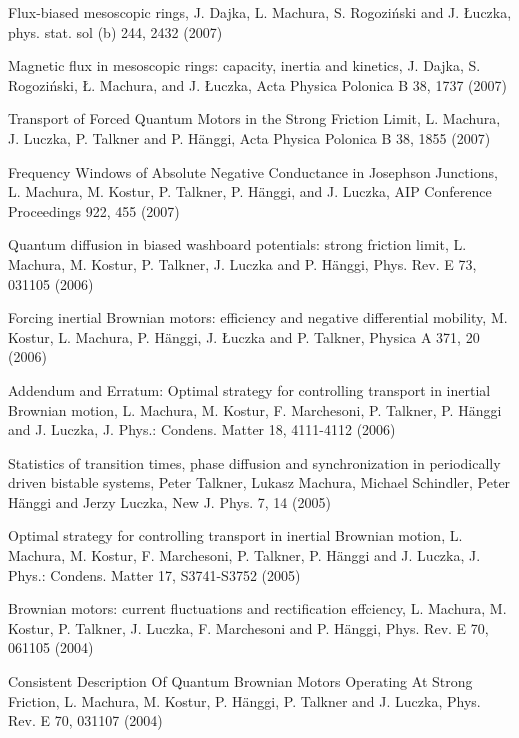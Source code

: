 \begin{etaremune}
\item Flux-biased mesoscopic rings, J. Dajka, L. Machura, S. Rogoziński and J. Łuczka, phys. stat. sol (b) 244,  2432 (2007)

\item Magnetic flux in mesoscopic rings: capacity, inertia and kinetics, J. Dajka, S. Rogoziński, Ł. Machura, and J. Łuczka, Acta Physica Polonica B 38,  1737 (2007)

\item Transport of Forced Quantum Motors in the Strong Friction Limit, L. Machura, J. Luczka, P. Talkner and P. Hänggi, Acta Physica Polonica B 38,  1855 (2007)

\item Frequency Windows of Absolute Negative Conductance in Josephson Junctions, L. Machura, M. Kostur, P. Talkner, P. Hänggi, and J. Luczka, AIP Conference Proceedings 922,  455 (2007)

\item Quantum diffusion in biased washboard potentials: strong friction limit, L. Machura, M. Kostur, P. Talkner, J. Luczka and P. Hänggi, Phys. Rev. E 73,  031105 (2006)

\item Forcing inertial Brownian motors: efficiency and negative differential mobility, M. Kostur, L. Machura, P. Hänggi, J. Łuczka and P. Talkner, Physica A 371,  20 (2006)

\item Addendum and Erratum: Optimal strategy for controlling transport in inertial Brownian motion, L. Machura, M. Kostur, F. Marchesoni, P. Talkner, P. Hänggi and J. Luczka, J. Phys.: Condens. Matter 18,  4111-4112 (2006)

\item Statistics of transition times, phase diffusion and synchronization in periodically driven bistable systems, Peter Talkner, Lukasz Machura, Michael Schindler, Peter Hänggi and Jerzy Luczka, New J. Phys. 7,  14 (2005)

\item Optimal strategy for controlling transport in inertial Brownian motion, L. Machura, M. Kostur, F. Marchesoni, P. Talkner, P. Hänggi and J. Luczka, J. Phys.: Condens. Matter 17,  S3741-S3752 (2005)

\item Brownian motors: current fluctuations and rectification effciency, L. Machura, M. Kostur, P. Talkner, J. Luczka, F. Marchesoni and P. Hänggi, Phys. Rev. E 70,  061105 (2004)

\item Consistent Description Of Quantum Brownian Motors Operating At Strong Friction, L. Machura, M. Kostur, P. Hänggi, P. Talkner and J. Luczka, Phys. Rev. E 70,  031107 (2004)

\end{etaremune}